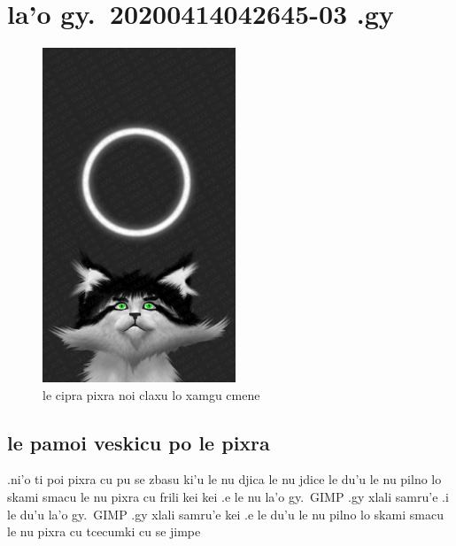 \documentclass{report}
\newcommand\imageheight{10cm}
\begin{document}
\chapter{la'o gy.\ 20200414042645-03 .gy}
\begin{figure}[ht]
	\centering
	\includegraphics[height=\imageheight]{20200414042645-03/20200414042645-03.jpg}
	\caption[center]{le cipra pixra noi claxu lo xamgu cmene}
\end{figure}
\section{le pamoi veskicu po le pixra}
.ni'o ti poi pixra cu pu se zbasu ki'u le nu djica le nu jdice le du'u le nu pilno lo skami smacu le nu pixra cu frili kei kei .e le nu la'o gy.\ GIMP .gy xlali samru'e \@ .i le du'u la'o gy.\ GIMP .gy xlali samru'e kei .e le du'u le nu pilno lo skami smacu le nu pixra cu tcecumki cu se jimpe
\end{document}
